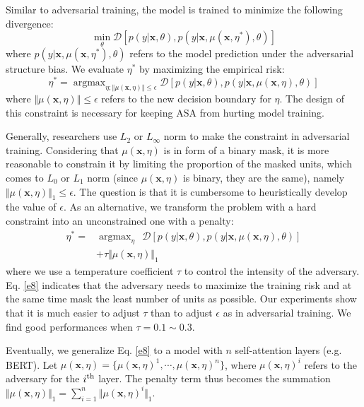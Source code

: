\documentclass[letterpaper]{article} \usepackage{aaai23}  \usepackage{times}  \usepackage{helvet}  \usepackage{courier}  \usepackage[hyphens]{url}  \usepackage{graphicx} \urlstyle{rm} \def\UrlFont{\rm}  \usepackage{natbib}  \usepackage{caption} \frenchspacing  \setlength{\pdfpagewidth}{8.5in}  \setlength{\pdfpageheight}{11in}  \usepackage{algorithm}
\begin{document}
Similar to adversarial training, the model is trained to minimize the following divergence:
\begin{equation}
\mathop{\min}_\theta \mathcal D \left[p(y|\mathbf x,\theta),p(y|\mathbf x,\mu(\mathbf x,\eta^*),\theta)\right]
\label{e6}
\end{equation}
where $ p(y|\mathbf x,\mu(\mathbf x,\eta^*),\theta) $ refers to the model prediction under the adversarial structure bias. We evaluate $ \eta^* $ by maximizing the empirical risk:
\begin{equation}
\eta^* = \mathop{\arg\max}_{\eta;\Vert \mu(\mathbf x,\eta) \Vert \le \epsilon} \mathcal D \left[p(y|\mathbf x,\theta),p(y|\mathbf x,\mu(\mathbf x,\eta),\theta)\right]
\label{e7}
\end{equation}
where $ \Vert \mu(\mathbf x,\eta) \Vert \le \epsilon $ refers to the new decision boundary for $ \eta $. The design of this constraint is necessary for keeping ASA from hurting model training.

Generally, researchers use $ L_2 $ or $ L_\infty $ norm to make the constraint in adversarial training. Considering that $ \mu(\mathbf x,\eta) $ is in form of a binary mask, it is more reasonable to constrain it by limiting the proportion of the masked units, which comes to $ L_0 $ or $ L_1 $ norm (since $ \mu(\mathbf x,\eta) $ is binary, they are the same), namely $ \Vert \mu(\mathbf x,\eta) \Vert_1 \le \epsilon $. The question is that it is cumbersome to heuristically develop the value of $ \epsilon $.  As an alternative, we transform the problem with a hard constraint into an unconstrained one with a penalty:
\begin{equation}
\begin{aligned}
\eta^* = &\mathop{\arg\max}_\eta \: \ \mathcal D \left[p(y|\mathbf x,\theta),p(y|\mathbf x,\mu(\mathbf x,\eta),\theta)\right]\\
       &+ \tau \Vert \mu(\mathbf x,\eta) \Vert_1
\end{aligned}
\label{e8}
\end{equation}
where we use a temperature coefficient $ \tau $ to control the intensity of the adversary. Eq. \ref{e8} indicates that the adversary needs to maximize the training risk and at the same time mask the least number of units as possible. Our experiments show that it is much easier to adjust $ \tau $ than to adjust $ \epsilon $ as in adversarial training. We find good performances when $ \tau=0.1\sim0.3 $.

Eventually, we generalize Eq. \ref{e8} to a model with $ n $ self-attention layers (e.g. BERT). Let $ \mu(\mathbf x,\eta)=\{\mu(\mathbf x,\eta)^1,\cdots,\mu(\mathbf x,\eta)^n\} $, where $ \mu(\mathbf x,\eta)^i $ refers to the adversary for the $ i^{\rm th} $ layer. The penalty term thus becomes the summation $ \Vert \mu(\mathbf x,\eta) \Vert_1=\sum_{i=1}^{n} \Vert \mu(\mathbf x,\eta)^i \Vert_1 $.
\end{document}
